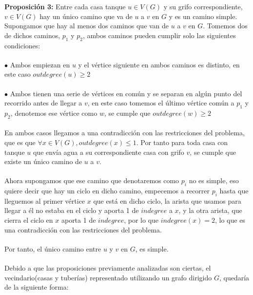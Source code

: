\documentclass{article}
\begin{document}
    \noindent \textbf{Proposici\'on 3:} Entre cada casa tanque $u \in V(G)$ y su grifo correspondiente, $v \in V(G)$ hay un \'unico camino
    que va de $u$ a $v$ en $G$ y es un camino simple.\\

    Supongamos que hay al menos dos caminos que van de $u$ a $v$ en $G$. Tomemos dos de dichos caminos, $p_1$ y $p_2$, ambos caminos pueden cumplir solo las 
    siguientes condiciones:\\\\

    $\bullet$ Ambos empiezan en $u$ y el v\'ertice siguiente en ambos caminos es distinto, en este caso $outdegree(u) \geq 2$\\\\
    $\bullet$ Ambos tienen una serie de v\'ertices en com\'un y se separan en alg\'un punto del recorrido antes de llegar a $v$, 
    en este caso tomemos el \'ultimo v\'ertice com\'un a $p_1$ y $p_2$, denotemos ese v\'ertice como $w$, se cumple que $outdegree(w) \geq 2$\\\\

    En ambos casos llegamos a una contradicci\'on con las restricciones del problema, que es que $\forall x \in V(G), outdegree(x) \leq 1$. 
    Por tanto para toda casa con tanque $u$ que env\'ia agua a su correspondiente casa con grifo $v$, se cumple que existe un \'unico camino de $u$ a $v$.\\\\

    Ahora supongamos que ese camino que denotaremos como $p_i$ no es simple, eso quiere decir que hay un ciclo en dicho camino, empecemos a recorrer $p_i$ hasta 
    que lleguemos al primer v\'ertice $x$ que est\'a en dicho ciclo, la arista que usamos para llegar a \'el no estaba en el ciclo y aporta 1 de $indegree$ a $x$,
    y la otra arista, que cierra el ciclo en $x$ aporta 1 de $indegree$, por lo que $indegree(x) = 2$, lo que es una contradicci\'on con las restricciones del problema.\\\\

    Por tanto, el \'unico camino entre $u$ y $v$ en $G$, es simple.\\\\

    Debido a que las proposiciones previamente analizadas son ciertas, el vecindario(casas y tuber\'ias) representado utilizando un grafo dirigido $G$, quedar\'ia de la siguiente forma:\\\\
\end{document}
